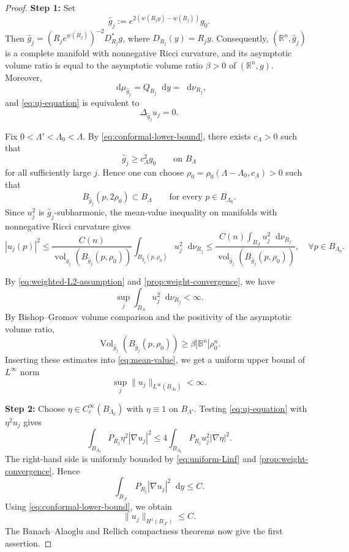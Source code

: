 \documentclass[10pt,a4paper]{amsart}
\numberwithin{equation}{section}
\newcommand{\dd}{\mathop{}\!\mathrm{d}}%
\begin{document}
\begin{proof}
{\bf Step 1: }
Set
\[
    \widehat g_j
    :=e^{2(w(R_jy)-\underline w(R_j))}g_0.
\]
Then $\widehat g_j
    =(R_je^{\underline w(R_j)})^{-2}D_{R_j}^*g$, where $D_{R_j}(y)=R_jy$.
Consequently, $(\mathbb R^n,\widehat g_j)$ is a complete manifold with nonnegative Ricci curvature,
and its asymptotic volume ratio is equal to the asymptotic volume ratio
$\beta>0$ of $(\mathbb R^n,g)$.  Moreover,
\[
    \dd \mu_{\widehat g_j}=Q_{R_j}\dd y=\dd \nu_{R_j},
\]
and \cref{eq:uj-equation} is equivalent to
\[
    \Delta_{\widehat g_j}u_j=0.
\]

Fix $0<\Lambda'<\Lambda_0<\Lambda$.  By
\cref{eq:conformal-lower-bound}, there exists $c_\Lambda>0$ such
that
\[
    \widehat g_j\geq c_\Lambda^2g_0
    \qquad\text{on }B_\Lambda
\]
for all sufficiently large $j$.  Hence one can choose
$\rho_0=\rho_0(\Lambda-\Lambda_0,c_\Lambda)>0$ such that
\[
    B_{\widehat g_j}(p,2\rho_0)\subset B_\Lambda
    \qquad\text{for every }p\in B_{\Lambda_0}.
\]
Since $u_j^2$ is $\widehat g_j$-subharmonic, the mean-value inequality on
manifolds with nonnegative Ricci curvature \cite[Theorem 2.1]{LS} gives
\begin{equation}\label{eq:mean-value}
    |u_j(p)|^2
    \leq
    \frac{C(n)}{
    \operatorname{vol}_{\widehat g_j}
    (B_{\widehat g_j}(p,\rho_0))}
    \int_{B_{\widehat g_j}(p,\rho_0)}u_j^2\dd\nu_{R_j}
    \leq \frac{C(n)\int_{B_\Lambda}
    u_j^2\dd\nu_{R_j}}{
    \operatorname{vol}_{\widehat g_j}
    (B_{\widehat g_j}(p,\rho_0))}
    ,\quad 
    \forall p\in B_{\Lambda_0}.
\end{equation}

 By
\cref{eq:weighted-L2-assumption} and
\cref{prop:weight-convergence}, we have
\[
    \sup_j\int_{B_\Lambda}u_j^2\dd\nu_{R_j}<\infty.
\]
By Bishop--Gromov volume comparison and the positivity of the asymptotic volume ratio,
\[
    \operatorname{Vol}_{\widehat g_j}
    (B_{\widehat g_j}(p,\rho_0))
    \geq\beta|\mathbb{B}^n|\rho_0^n.
\]
Inserting these estimates into \cref{eq:mean-value}, we get a uniform upper bound of $L^\infty$ norm
\begin{equation}\label{eq:uniform-Linf}
    \sup_j\|u_j\|_{L^\infty(B_{\Lambda_0})}<\infty.
\end{equation}

{\bf Step 2:} 
Choose $\eta\in C_c^\infty(B_{\Lambda_0})$ with
$\eta\equiv1$ on $B_{\Lambda'}$.  Testing
\cref{eq:uj-equation} with $\eta^2u_j$ gives
\[
    \int_{B_{\Lambda_0}} P_{R_j}\eta^2|\nabla u_j|^2
    \leq 4\int_{B_{\Lambda_0}}
    P_{R_j}u_j^2|\nabla\eta|^2.
\]
The right-hand side is uniformly bounded by
\cref{eq:uniform-Linf} and
\cref{prop:weight-convergence}.
Hence
\begin{equation}\label{eq:weighted-energy-bound}
    \int_{B_{\Lambda'}}P_{R_j}|\nabla u_j|^2\dd y\leq C.
\end{equation}
Using \cref{eq:conformal-lower-bound}, we obtain
\begin{equation}\label{eq:ordinary-H1-bound}
    \|u_j\|_{H^1(B_{\Lambda'})}\leq C.
\end{equation}
The Banach--Alaoglu and Rellich compactness theorems now give
the first assertion.
\medskip


\end{proof}
\end{document}
